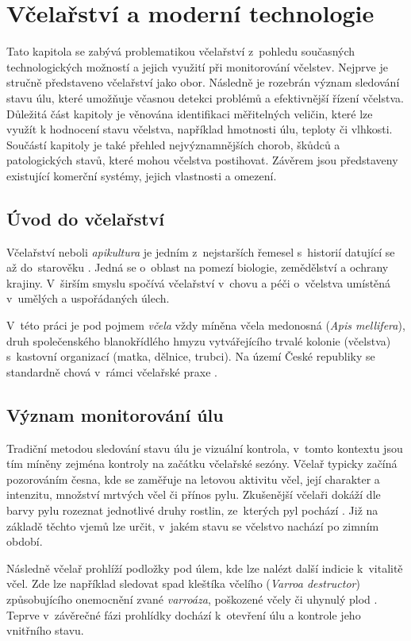 \chapter{Včelařství a moderní technologie} \label{vcelareni}
Tato kapitola se zabývá problematikou včelařství z~pohledu současných technologických možností a jejich využití při monitorování včelstev. Nejprve je stručně představeno včelařství jako obor. Následně je rozebrán význam sledování stavu úlu, které umožňuje včasnou detekci problémů a efektivnější řízení včelstva. Důležitá část kapitoly je věnována identifikaci měřitelných veličin, které lze využít k hodnocení stavu včelstva, například hmotnosti úlu, teploty či vlhkosti. Součástí kapitoly je také přehled nejvýznamnějších chorob, škůdců a patologických stavů, které mohou včelstva postihovat. Závěrem jsou představeny existující komerční systémy, jejich vlastnosti a omezení.

\section{Úvod do včelařství}
Včelařství neboli \textit{apikultura} je jedním z~nejstarších řemesel s~historií datující se až do~starověku \cite{Gerstmeier}. Jedná se o~oblast na pomezí biologie, zemědělství a ochrany krajiny. V~širším smyslu spočívá včelařství v~chovu a péči o~včelstva umístěná v~umělých a uspořádaných úlech. 

V~této práci je pod pojmem \textit{včela} vždy míněna včela medonosná (\textit{Apis mellifera}), druh společenského blanokřídlého hmyzu vytvářejícího trvalé kolonie (včelstva) s~kastovní organizací (matka, dělnice, trubci). Na území České republiky se standardně chová v~rámci včelařské praxe \cite{naturaBohemica}.

\section{Význam monitorování úlu}
Tradiční metodou sledování stavu úlu je vizuální kontrola, v~tomto kontextu jsou tím míněny zejména kontroly na začátku včelařské sezóny. Včelař typicky začíná pozorováním česna, kde se zaměřuje na letovou aktivitu včel, její charakter a intenzitu, množství mrtvých včel či přínos pylu. Zkušenější včelaři dokáží dle barvy pylu rozeznat jednotlivé druhy rostlin, ze~kterých pyl pochází \cite{Storch}. Již na základě těchto vjemů lze určit, v~jakém stavu se včelstvo nachází po zimním období.

Následně včelař prohlíží podložky pod úlem, kde lze nalézt další indicie k~vitalitě včel. Zde lze například sledovat spad kleštíka včelího (\textit{Varroa destructor}) způsobujícího onemocnění zvané \textit{varroáza}, poškozené včely či uhynulý plod \cite{Gerstmeier}. Teprve v~závěrečné fázi prohlídky dochází k~otevření úlu a kontrole jeho vnitřního stavu.

